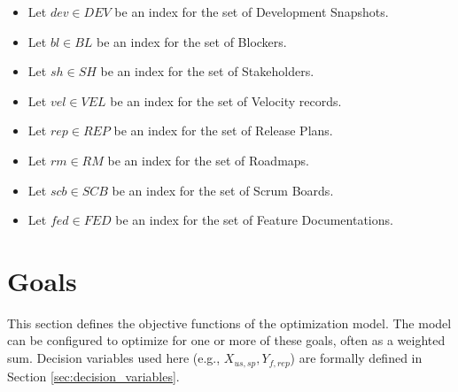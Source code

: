 \documentclass[11pt]{article}
\begin{document}
\begin{itemize}
    \item Let $dev \in DEV$ be an index for the set of Development Snapshots.
    \item Let $bl \in BL$ be an index for the set of Blockers.
    \item Let $sh \in SH$ be an index for the set of Stakeholders.
    \item Let $vel \in VEL$ be an index for the set of Velocity records.
    \item Let $rep \in REP$ be an index for the set of Release Plans.
    \item Let $rm \in RM$ be an index for the set of Roadmaps.
    \item Let $scb \in SCB$ be an index for the set of Scrum Boards.
    \item Let $fed \in FED$ be an index for the set of Feature Documentations.
\end{itemize}

\section{Goals}
\label{sec:goals}
This section defines the objective functions of the optimization model. The model can be configured to optimize for one or more of these goals, often as a weighted sum. Decision variables used here (e.g., $X_{us,sp}, Y_{f,rep}$) are formally defined in Section \ref{sec:decision_variables}.
\end{document}
